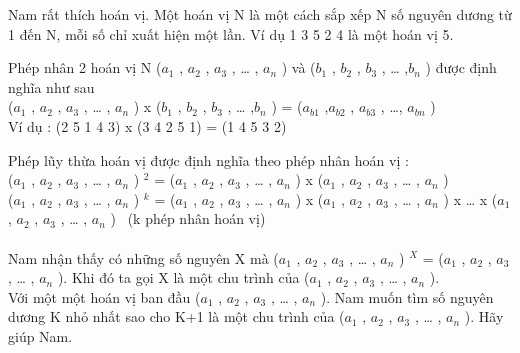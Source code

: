 Nam rất thích hoán vị. Một hoán vị N là một cách sắp xếp N số nguyên dương từ 1 đến N, mỗi số chỉ xuất hiện một lần. Ví dụ 1 3 5 2 4 là một hoán vị 5.

Phép nhân 2 hoán vị N ($a_{1}$ , $a_{2}$ , $a_{3}$ , … , $a_{n}$ ) và ($b_{1}$ , $b_{2}$ , $b_{3}$ , … ,$b_{n}$ ) được định nghĩa như sau
\\($a_{1}$ , $a_{2}$ , $a_{3}$ , … , $a_{n}$ ) x ($b_{1}$ , $b_{2}$ , $b_{3}$ , … ,$b_{n}$ ) = ($a_{b1}$ ,$a_{b2}$ , $a_{b3}$ , …, $a_{bn}$ )
\\Ví dụ : (2 5 1 4 3) x (3 4 2 5 1) = (1 4 5 3 2)

Phép lũy thừa hoán vị được định nghĩa theo phép nhân hoán vị :
\\($a_{1}$ , $a_{2}$ , $a_{3}$ , … , $a_{n}$ ) $^ 2 $ = ($a_{1}$ , $a_{2}$ , $a_{3}$ , … , $a_{n}$ ) x ($a_{1}$ , $a_{2}$ , $a_{3}$ , … , $a_{n}$ )
\\($a_{1}$ , $a_{2}$ , $a_{3}$ , … , $a_{n}$ ) $^ k $ = ($a_{1}$ , $a_{2}$ , $a_{3}$ , … , $a_{n}$ ) x ($a_{1}$ , $a_{2}$ , $a_{3}$ , … , $a_{n}$ ) x … x ($a_{1}$ , $a_{2}$ , $a_{3}$ , … , $a_{n}$ )  (k phép nhân hoán vị)
\\
\\Nam nhận thấy có những số nguyên X mà ($a_{1}$ , $a_{2}$ , $a_{3}$ , … , $a_{n}$ ) $^ X $ = ($a_{1}$ , $a_{2}$ , $a_{3}$ , … , $a_{n}$ ). Khi đó ta gọi X là một chu trình của ($a_{1}$ , $a_{2}$ , $a_{3}$ , … , $a_{n}$ ).
\\Với một một hoán vị ban đầu ($a_{1}$ , $a_{2}$ , $a_{3}$ , … , $a_{n}$ ). Nam muốn tìm số nguyên dương K nhỏ nhất sao cho K+1 là một chu trình của ($a_{1}$ , $a_{2}$ , $a_{3}$ , … , $a_{n}$ ). Hãy giúp Nam.